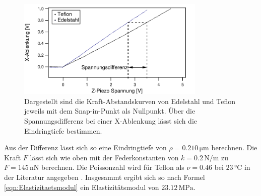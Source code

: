 \begin{figure}[H]
    \centering
    \includegraphics[width=0.8\textwidth]{bilder/Kraft_Abstand/Differenz.pdf}
    \caption{Dargestellt sind die Kraft-Abstandskurven von Edelstahl und Teflon jeweils mit dem Snap-in-Punkt als Nullpunkt. Über die Spannungsdifferenz bei einer X-Ablenkung lässt sich die Eindringtiefe bestimmen.}
    \label{fig:Differenz}
\end{figure}

Aus der Differenz lässt sich so eine Eindringtiefe von $\rho=0.210\,\si{\micro\meter}$ berechnen.
Die Kraft $F$ lässt sich wie oben mit der Federkonstanten von $k=0.2\,\si{\newton\per\meter}$ zu $F=145\,\si{\nano\newton}$ berechnen.
Die Poissonzahl wird für Teflon als $\nu=0.46$ bei $23\,\si{\celsius}$ in der Literatur angegeben \cite{P}.
Insgesammt ergibt sich so nach Formel \autoref{eqn:Elastizitaetsmodul} ein Elastizitätsmodul von $23.12\,\si{\mega\pascal}$.
